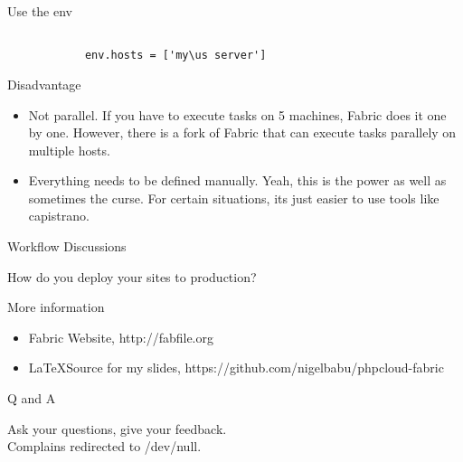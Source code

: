 \documentclass[xcolor=dvipsnames]{beamer}
\def\us{\char`\_}
\begin{document}
    \begin{frame}{Use the env}
        \begin{verbatim}
    
            env.hosts = ['my\us server']

        \end{verbatim}
    \end{frame}    

    \begin{frame}{Disadvantage}
        \begin{itemize}
            \pause \item Not parallel.  If you have to execute tasks on 5 machines, Fabric does it one by one.  \pause However, there is a fork of Fabric that can execute tasks parallely on multiple hosts.
            \pause \item Everything needs to be defined manually.  Yeah, this is the power as well as sometimes the curse.  For certain situations, its just easier to use tools like capistrano.
        \end{itemize}
    \end{frame}    

    \begin{frame}{Workflow Discussions}
        \begin{center}
        \pause How do you deploy your sites to production?
        \end{center}
    \end{frame}  

    \begin{frame}{More information}
        \begin{itemize}
        \item Fabric Website, http://fabfile.org
        \item \LaTeX Source for my slides, https://github.com/nigelbabu/phpcloud-fabric
        \end{itemize}
    \end{frame}

    \begin{frame}{Q and A}
        \begin{center}
        \pause Ask your questions, give your feedback. \\
        \pause \small Complains redirected to /dev/null.
        \end{center}
    \end{frame}  
\end{document}
